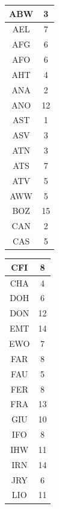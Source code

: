 \documentclass[main.tex]{subfiles}
\begin{document}
\begin{table}
	\centering
\begin{minipage}[t]{0.24\linewidth}
\vspace{0pt}\centering
\begin{tabular}{|c|c|}
\hline
ABW&3\\\hline
AEL&7\\\hline
AFG&6\\\hline
AFO&6\\\hline
AHT&4\\\hline
ANA&2\\\hline
ANO&12\\\hline
AST&1\\\hline
ASV&3\\\hline
ATN&3\\\hline
ATS&7\\\hline
ATV&5\\\hline
AWW&5\\\hline
BOZ&15\\\hline
CAN&2\\\hline
CAS&5\\
\end{tabular}
\end{minipage}%
\begin{minipage}[t]{0.24\linewidth}
\vspace{0pt}\centering
\begin{tabular}{|c|c|}
CFI&8\\\hline
CHA&4\\\hline
DOH&6\\\hline
DON&12\\\hline
EMT&14\\\hline
EWO&7\\\hline
FAR&8\\\hline
FAU&5\\\hline
FER&8\\\hline
FRA&13\\\hline
GIU&10\\\hline
IFO&8\\\hline
IHW&11\\\hline
IRN&14\\\hline
JRY&6\\\hline
LIO&11\\
\end{tabular}
\end{minipage}%
\begin{minipage}[t]{0.24\linewidth}
\vspace{0pt}\centering
\begin{tabular}{|c|c|}

\end{tabular}
\end{minipage}
\end{table}
\end{document}
